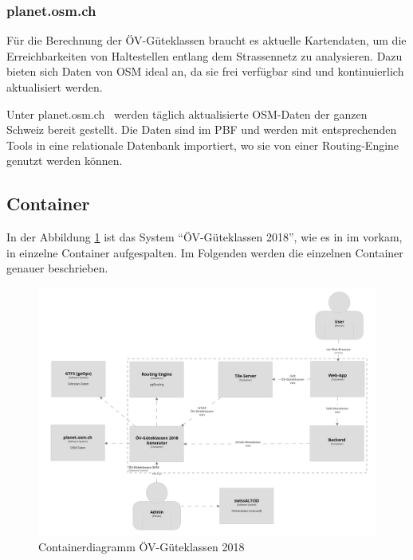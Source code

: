\subsubsection{planet.osm.ch}
\label{subsystem:planet.osm.ch}

Für die Berechnung der ÖV-Güteklassen braucht es aktuelle Kartendaten, um die Erreichbarkeiten von Haltestellen entlang dem Strassennetz zu analysieren.
Dazu bieten sich Daten von \acl{OSM} ideal an, da sie frei verfügbar sind und kontinuierlich aktualisiert werden.

Unter planet.osm.ch~\cite{planet_osm_ch} werden täglich aktualisierte \ac{OSM}-Daten der ganzen Schweiz bereit gestellt.
Die Daten sind im \ac{PBF} und werden mit entsprechenden Tools in eine relationale Datenbank importiert, wo sie von einer Routing-Engine genutzt werden können.


\subsection{Container}
\label{Architektur:Container}

In der Abbildung \ref{fig:container-diagram} ist das System "`ÖV-Güteklassen 2018"', wie es in im  vorkam, in einzelne Container aufgespalten.
Im Folgenden werden die einzelnen Container genauer beschrieben.

\begin{figure}[ht]
    \centering
    \includegraphics[width=1.0\linewidth]{projectdoc/img/container-diagram.png}
    \caption[Containerdiagramm]{Containerdiagramm ÖV-Güteklassen 2018}
    \label{fig:container-diagram}
\end{figure}

